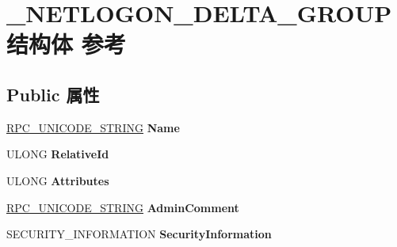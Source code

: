 \hypertarget{struct___n_e_t_l_o_g_o_n___d_e_l_t_a___g_r_o_u_p}{}\section{\+\_\+\+N\+E\+T\+L\+O\+G\+O\+N\+\_\+\+D\+E\+L\+T\+A\+\_\+\+G\+R\+O\+U\+P结构体 参考}
\label{struct___n_e_t_l_o_g_o_n___d_e_l_t_a___g_r_o_u_p}
\subsection*{Public 属性}
\begin{DoxyCompactItemize}
\item 
\mbox{\label{struct___n_e_t_l_o_g_o_n___d_e_l_t_a___g_r_o_u_p_a724ddb6dd6f01d7ad80cf6b377731c59}} 
\hyperlink{struct___r_p_c___u_n_i_c_o_d_e___s_t_r_i_n_g}{R\+P\+C\+\_\+\+U\+N\+I\+C\+O\+D\+E\+\_\+\+S\+T\+R\+I\+NG} {\bfseries Name}
\item 
\mbox{\label{struct___n_e_t_l_o_g_o_n___d_e_l_t_a___g_r_o_u_p_a1b63fde3c1d3bbe71af0534702a6bf06}} 
U\+L\+O\+NG {\bfseries Relative\+Id}
\item 
\mbox{\label{struct___n_e_t_l_o_g_o_n___d_e_l_t_a___g_r_o_u_p_a4fcc4398856a8029ae966dd7a97d4cde}} 
U\+L\+O\+NG {\bfseries Attributes}
\item 
\mbox{\label{struct___n_e_t_l_o_g_o_n___d_e_l_t_a___g_r_o_u_p_aeeb560aa589a55dd60fd3fecd0369ed0}} 
\hyperlink{struct___r_p_c___u_n_i_c_o_d_e___s_t_r_i_n_g}{R\+P\+C\+\_\+\+U\+N\+I\+C\+O\+D\+E\+\_\+\+S\+T\+R\+I\+NG} {\bfseries Admin\+Comment}
\item 
\mbox{\label{struct___n_e_t_l_o_g_o_n___d_e_l_t_a___g_r_o_u_p_a9cd58d56dae7c54740a7a1d493d2cff7}} 
S\+E\+C\+U\+R\+I\+T\+Y\+\_\+\+I\+N\+F\+O\+R\+M\+A\+T\+I\+ON {\bfseries Security\+Information}
\item 
\mbox{\label{struct___n_e_t_l_o_g_o_n___d_e_l_t_a___g_r_o_u_p_abc7d0ca9c34ebf760aecf64eed81ad87}} 

\end{DoxyCompactItemize}
